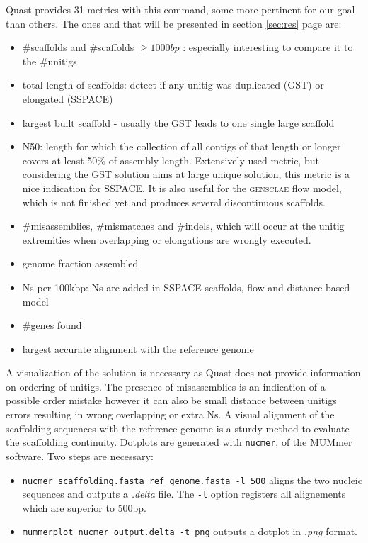 \documentclass[12pt]{article}
\newcommand*{\fulleref}[1]{section \hyperref[{#1}] {\ref*{#1}} page {\pageref{#1}}}%
\begin{document}
Quast provides 31 metrics with this command, some more pertinent for our goal than others. The ones and that will be presented in \fulleref{sec:res} are: 
\begin{itemize}
\item \#scaffolds and \#scaffolds $\geq 1000bp$ : especially interesting to compare it to the \#unitigs
\item total length of scaffolds: detect if any unitig was duplicated (GST) or elongated (SSPACE)
\item largest built scaffold - usually the GST leads to one single large scaffold
\item N50:  length for which the collection of all contigs of that length or longer covers at least 50\% of assembly length. Extensively used metric, but considering the GST solution aims at large unique solution, this metric is a nice indication for SSPACE. It is also useful for the \textsc{gensclae} flow model, which is not finished yet and produces several discontinuous scaffolds.
\item \#misassemblies, \#mismatches and \#indels, which will occur at the unitig extremities when overlapping or elongations are wrongly executed.
\item genome fraction assembled 
\item Ns per 100kbp: Ns are added in SSPACE scaffolds, flow and distance based model
\item \#genes found
\item largest accurate alignment with the reference genome
\end{itemize}
A visualization of the solution is necessary as Quast does not provide information on ordering of unitigs. The presence of misassemblies is an indication of a possible order mistake however it can also be small distance between unitigs errors resulting in wrong overlapping or extra Ns. A visual alignment of the scaffolding sequences with the reference genome is a sturdy method to evaluate the scaffolding continuity. Dotplots are generated with \texttt{nucmer}, of the MUMmer software. Two steps are necessary: 
\begin{itemize}
\item \texttt{nucmer scaffolding.fasta ref\_genome.fasta -l 500} aligns the two nucleic sequences and outputs a \textit{.delta} file. The \texttt{-l} option registers all alignements which are superior to 500bp.
\item \texttt{mummerplot nucmer\_output.delta -t png} outputs a dotplot in \textit{.png} format.
\end{itemize}
\end{document}
